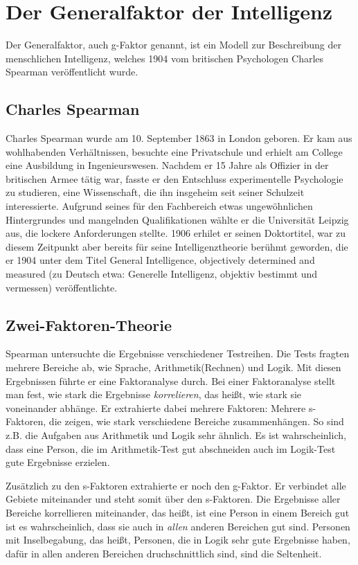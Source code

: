 \chapter{Der Generalfaktor der Intelligenz}

Der Generalfaktor, auch g-Faktor genannt, ist ein Modell zur Beschreibung der
menschlichen Intelligenz, welches 1904 vom britischen Psychologen
Charles Spearman veröffentlicht wurde. \cite{wiki_spearman}

\section{Charles Spearman}
Charles Spearman wurde am 10. September 1863 in London geboren. \cite{wiki_spearman} Er kam aus wohlhabenden Verhältnissen, besuchte eine Privatschule und erhielt am College eine Ausbildung in Ingenieurswesen. Nachdem er 15 Jahre als Offizier in der britischen Armee tätig war, fasste er den Entschluss experimentelle Psychologie zu studieren, eine Wissenschaft, die ihn insgeheim seit seiner Schulzeit interessierte. \cite{galton_spearman} Aufgrund seines für den Fachbereich etwas ungewöhnlichen Hintergrundes und mangelnden Qualifikationen wählte er die Universität Leipzig aus, die lockere Anforderungen stellte. 1906 erhilet er seinen Doktortitel, war zu diesem Zeitpunkt aber bereits für seine Intelligenztheorie berühmt geworden, die er 1904 unter dem Titel \glqq General Intelligence, objectively determined and measured\grqq{} (zu Deutsch etwa: Generelle Intelligenz, objektiv bestimmt und vermessen) veröffentlichte.
\cite{wiki_en_spearman} \cite{york_spearman}

\section{Zwei-Faktoren-Theorie}
Spearman untersuchte die Ergebnisse verschiedener Testreihen. Die Tests fragten mehrere Bereiche ab, wie Sprache, Arithmetik(Rechnen) und Logik. Mit diesen Ergebnissen führte er eine Faktoranalyse durch. Bei einer Faktoranalyse stellt man fest, wie stark die Ergebnisse \emph{korrelieren}, das heißt, wie stark sie voneinander abhänge. Er extrahierte dabei mehrere Faktoren: Mehrere s-Faktoren, die zeigen, wie stark verschiedene Bereiche zusammenhängen. So sind z.B. die Aufgaben aus Arithmetik und Logik sehr ähnlich. Es ist wahrscheinlich, dass eine Person, die im Arithmetik-Test gut abschneiden auch im Logik-Test gute Ergebnisse erzielen.

Zusätzlich zu den s-Faktoren extrahierte er noch den g-Faktor. Er verbindet alle Gebiete miteinander und steht somit über den s-Faktoren. Die Ergebnisse aller Bereiche korrellieren miteinander, das heißt, ist eine Person in einem Bereich gut ist es wahrscheinlich, dass sie auch in \emph{allen} anderen Bereichen gut sind. Personen mit Inselbegabung, das heißt, Personen, die in Logik sehr gute Ergebnisse haben, dafür in allen anderen Bereichen druchschnittlich sind, sind die Seltenheit.

\cite{wiki_intheorie}
